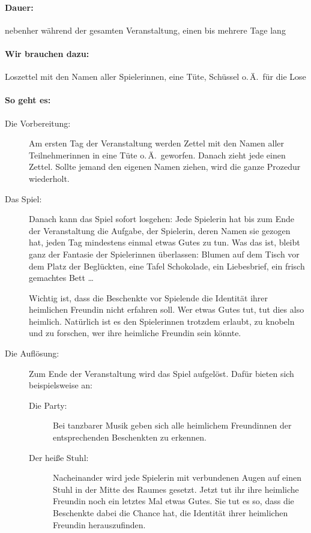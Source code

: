 \paragraph{Dauer:} nebenher während der gesamten Veranstaltung, einen bis mehrere Tage lang
\paragraph{Wir brauchen dazu:}  Loszettel mit den Namen aller Spielerinnen, eine Tüte, Schüssel o.\,Ä.~für die Lose
\paragraph{So geht es:}
\begin{description}
\item[Die Vorbereitung:] Am ersten Tag der Veranstaltung werden Zettel mit den Namen aller Teilnehmerinnen in eine Tüte o.\,Ä.~geworfen. Danach zieht jede einen Zettel. Sollte jemand den eigenen Namen ziehen, wird die ganze Prozedur wiederholt.

\item[Das Spiel:] Danach kann das Spiel sofort losgehen: Jede Spielerin hat bis zum Ende der Veranstaltung die Aufgabe, der Spielerin, deren Namen sie gezogen hat, jeden Tag mindestens einmal etwas Gutes zu tun. Was das ist, bleibt ganz der Fantasie der Spielerinnen überlassen: Blumen auf dem Tisch vor dem Platz der Beglückten, eine Tafel Schokolade, ein Liebesbrief, ein frisch gemachtes Bett \ldots

Wichtig ist, dass die Beschenkte vor Spielende die Identität ihrer heimlichen Freundin nicht erfahren soll. Wer etwas Gutes tut, tut dies also heimlich. Natürlich ist es den Spielerinnen trotzdem erlaubt, zu knobeln und zu forschen, wer ihre heimliche Freundin sein könnte.

\item[Die Auflösung:] Zum Ende der Veranstaltung wird das Spiel aufgelöst. Dafür bieten sich beispielsweise an:
  \begin{description}
    \item[Die Party:] Bei tanzbarer Musik geben sich alle heimlichem Freundinnen der entsprechenden Beschenkten zu erkennen.
    \item[Der heiße Stuhl:] Nacheinander wird jede Spielerin mit verbundenen Augen auf einen Stuhl in der Mitte des Raumes gesetzt. Jetzt tut ihr ihre heimliche Freundin noch ein letztes Mal etwas Gutes. Sie tut es so, dass die Beschenkte dabei die Chance hat, die Identität ihrer heimlichen Freundin herauszufinden.
  \end{description}
\end{description}

